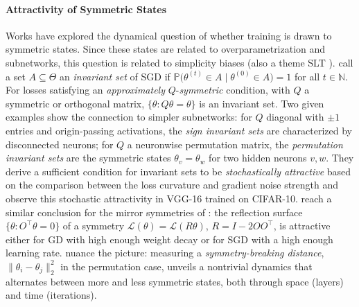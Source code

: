 \documentclass[mathematics,review,submit,moreauthors]{Definitions/mdpi}
\begin{document}
\paragraph{Attractivity of Symmetric States}
Works have explored the dynamical question of whether training is drawn to symmetric states.
Since these states are related to overparametrization and subnetworks, this question is related to simplicity biases (also a theme SLT ). 
\citet{chen2024jsm} call a set $A\subseteq\Theta$ an \emph{invariant set} of SGD if $\mathbb{P}\big(\theta^{(t)}\in A \mid \theta^{(0)}\in A\big)=1$ for all $t\in\mathbb{N}$.
For losses satisfying an \emph{approximately} $Q$-\emph{symmetric} condition, with $Q$ a symmetric or orthogonal matrix, $\{\theta : Q\theta=\theta\}$ is an invariant set.
Two given examples show the connection to simpler subnetworks: for $Q$ diagonal with $\pm1$ entries and origin-passing activations, the \emph{sign invariant sets} are characterized by disconnected neurons; for $Q$ a neuronwise permutation matrix, the \emph{permutation invariant sets} are the symmetric states $\theta_v=\theta_w$ for two hidden neurons $v,w$.
They derive a sufficient condition for invariant sets to be \emph{stochastically attractive} based on the comparison between the loss curvature and gradient noise strength and observe this stochastic attractivity in VGG-16 trained on CIFAR-10.
\citet{ziyin2024} reach a similar conclusion for the mirror symmetries of : the reflection surface $\{\theta : O^{\top}\theta=0\}$ of a symmetry $\mathcal{L}(\theta)=\mathcal{L}(R\theta)$, $R=I-2OO^{\top}$, is attractive either for GD with high enough weight decay or for SGD with a high enough learning rate.
\citet{ziyin2025} nuance the picture: measuring a \emph{symmetry-breaking distance}, $\lVert\theta_i-\theta_j\rVert_2^2$ in the permutation case, unveils a nontrivial dynamics that alternates between more and less symmetric states, both through space (layers) and time (iterations).
\end{document}
